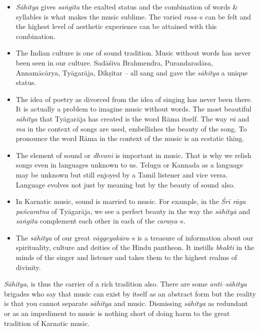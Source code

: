 \begin{itemize}
\item \textit{Sāhitya} gives \textit{saṅgīta} the exalted status and the combination of words \& syllables is what makes the music sublime. The varied \textit{rasa}–s can be felt and the highest level of aesthetic experience can be attained with this combination.

 \item The Indian culture is one of sound tradition. Music without words has never been seen in our culture. Sadāśiva Brahmendra, Purandaradāsa, Annamācārya, Tyāgarāja, Dīkṣitar – all sang and gave the \textit{sāhitya} a unique status. 

 \item The idea of poetry as divorced from the idea of singing has never been there. It is actually a problem to imagine music without words. The most beautiful \textit{sāhitya} that Tyāgarāja has created is the word Rāma itself. The way \textit{rā} and \textit{ma} in the context of songs are used, embellishes the beauty of the song. To pronounce the word Rāma in the context of the music is an ecstatic thing.

 \item The element of sound or \textit{dhvani} is important in music. That is why we relish songs even in languages unknown to us. Telugu or Kannada as a language may be unknown but still enjoyed by a Tamil listener and vice versa. Language evolves not just by meaning but by the beauty of sound also. 

 \item In Karnatic music, sound is married to music. For example, in the \textit{Śrī rāga pañcaratna} of Tyāgarāja, we see a perfect beauty in the way the \textit{sāhityā} and \textit{saṅgīta} complement each other in each of the \textit{caraṇa}–s.

 \item The \textit{sāhitya} of our great \textit{vāggeyakāra}–s is a treasure of information about our spirituality, culture and deities of the Hindu pantheon. It instills \textit{bhakti} in the minds of the singer and listener and takes them to the highest realms of divinity.

\end{itemize}

\textit{Sāhitya}, is thus the carrier of a rich tradition also. There are some \textit{anti–sāhitya} brigades who say that music can exist by itself as an abstract form but the reality is that you cannot separate \textit{sāhitya} and music. Dismissing \textit{sāhitya} as redundant or as an impediment to music is nothing short of doing harm to the great tradition of Karnatic music.

